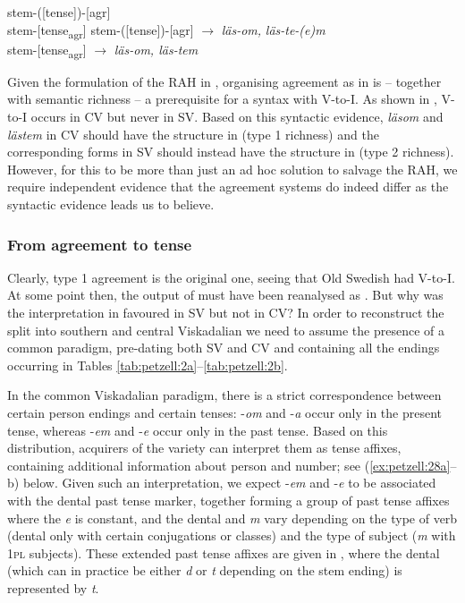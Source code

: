 \documentclass[output=paper,colorlinks,citecolor=brown,draft,draftmode]{langscibook}
\begin{document}
\ea\label{ex:petzell:26}
\ea\label{ex:petzell:26a}  stem-([tense])-[agr]\\
\ex\label{ex:petzell:26b}  stem-[tense\textsubscript{agr}]
\z
\ex\label{ex:petzell:27}
\ea\label{ex:petzell:27a}  stem-([tense])-[agr]  $\to$ \textit{läs-om,} \textit{läs-te-(e)m}\\
\ex\label{ex:petzell:27b}  stem-[tense\textsubscript{agr}]      $\to$ \textit{läs-om, läs-tem}
\z
\z


Given the formulation of the RAH in , organising agreement as in  is – together with semantic richness – a prerequisite for a syntax with V-to-I. As shown in , V-to-I occurs in CV but never in SV. Based on this syntactic evidence, \textit{läsom} and \textit{lästem} in CV should have the structure in  (type 1 richness) and the corresponding forms in SV should instead have the structure in  (type 2 richness). However, for this to be more than just an ad hoc solution to salvage the RAH, we require independent evidence that the agreement systems do indeed differ as the syntactic evidence leads us to believe.


\subsubsection{From agreement to tense}\label{sec:petzell:4.3.2}\largerpage


Clearly, type 1 agreement is the original one, seeing that Old Swedish had V-to-I. At some point then, the output of  must have been reanalysed as . But why was the interpretation in  favoured in SV but not in CV? In order to reconstruct the split into southern and central Viskadalian we need to assume the presence of a common paradigm, pre-dating both SV and CV and containing all the endings occurring in Tables \ref{tab:petzell:2a}–\ref{tab:petzell:2b}.



In the common Viskadalian paradigm, there is a strict correspondence between certain person endings and certain tenses: -\textit{om} and -\textit{a} occur only in the present tense, whereas -\textit{em} and -\textit{e} occur only in the past tense. Based on this distribution, acquirers of the variety can interpret them as tense affixes, containing additional information about person and number; see (\ref{ex:petzell:28a}–b) below. Given such an interpretation, we expect -\textit{em} and -\textit{e} to be associated with the dental past tense marker, together forming a group of past tense affixes where the \textit{e} is constant, and the dental and \textit{m} vary depending on the type of verb (dental only with certain conjugations or classes) and the type of subject (\textit{m} with 1\textsc{pl} subjects). These extended past tense affixes are given in , where the dental (which can in practice be either \textit{d} or \textit{t} depending on the stem ending) is represented by \textit{t}.
\end{document}
